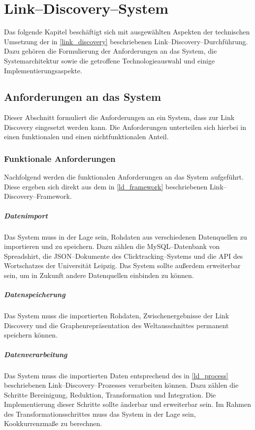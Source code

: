 \chapter{Link--Discovery--System}
\label{system}

Das folgende Kapitel beschäftigt sich mit ausgewählten Aspekten der technischen Umsetzung der in \cref{link_discovery} beschriebenen Link--Discovery--Durchführung. Dazu gehören die Formulierung der Anforderungen an das System, die Systemarchitektur sowie die getroffene Technologieauswahl und einige Implementierungsaspekte.

\section{Anforderungen an das System}
\label{requirements}

Dieser Abschnitt formuliert die Anforderungen an ein System, dass zur Link Discovery eingesetzt werden kann. Die Anforderungen unterteilen sich hierbei in einen funktionalen und einen nichtfunktionalen Anteil. 

\subsection{Funktionale Anforderungen}

Nachfolgend werden die funktionalen Anforderungen an das System aufgeführt. Diese ergeben sich direkt aus dem in \cref{ld_framework} beschriebenen Link--Discovery--Framework.

\paragraph{Datenimport} Das System muss in der Lage sein, Rohdaten aus verschiedenen Datenquellen zu importieren und zu speichern. Dazu zählen die MySQL--Datenbank von Spreadshirt, die JSON--Dokumente des Clicktracking--Systems und die API des Wortschatzes der Universität Leipzig. Das System sollte außerdem erweiterbar sein, um in Zukunft andere Datenquellen einbinden zu können.

\paragraph{Datenspeicherung} Das System muss die importierten Rohdaten, Zwischenergebnisse der Link Discovery und die Graphenrepräsentation des Weltausschnittes permanent speichern können.

\paragraph{Datenverarbeitung} Das System muss die importierten Daten entsprechend des in \cref{ld_process} beschriebenen Link--Discovery--Prozesses verarbeiten können. Dazu zählen die Schritte Bereinigung, Reduktion, Transformation und Integration. Die Implementierung dieser Schritte sollte änderbar und erweiterbar sein. Im Rahmen des Transformationsschrittes muss das System in der Lage sein, Kookkurrenzmaße zu berechnen.

